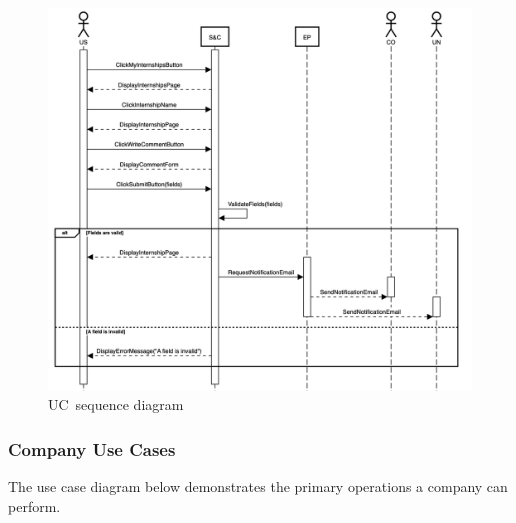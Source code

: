 \begin{figure}
    \centering
    \includegraphics[width=16cm]{images/sequence-diagrams/student-comments-internship.png}
    \caption{UC\theuc\ sequence diagram}
\end{figure}


\clearpage
\subsubsection{Company Use Cases}
The use case diagram below demonstrates the primary operations a company can perform.

